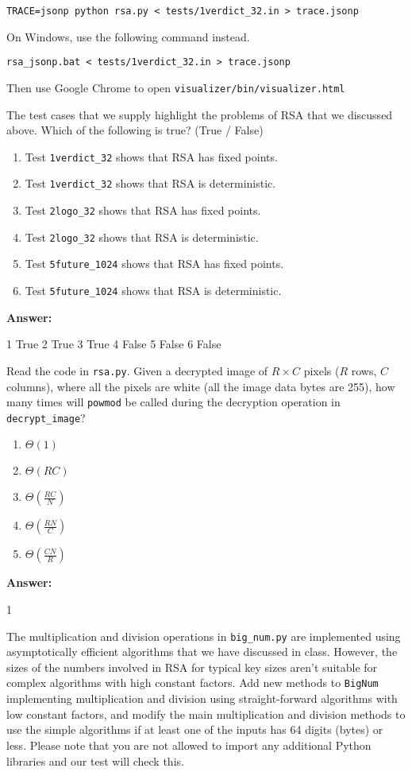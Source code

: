 \documentclass[12pt,twoside]{article}
\newcommand{\answer}{
 \par\medskip
 \textbf{Answer:}
}
\newcommand{\answerIIIe}{ \answer
1 True
2 True
3 True
4 False
5 False
6 False
}
\newcommand{\answerIIIf}{ \answer
1
}
\begin{document}
\begin{problems}
\texttt{TRACE=jsonp python rsa.py < tests/1verdict\_32.in > trace.jsonp}

On Windows, use the following command instead.

\texttt{rsa\_jsonp.bat < tests/1verdict\_32.in > trace.jsonp}

Then use Google Chrome to open
\texttt{visualizer/bin/visualizer.html}

\begin{problemparts}
\problempart {} The test cases that we supply highlight the problems of
RSA that we discussed above. Which of the following is true? (True / False)
\begin{enumerate}
  \item Test \texttt{1verdict\_32} shows that RSA has fixed points.
  \item Test \texttt{1verdict\_32} shows that RSA is deterministic.
  \item Test \texttt{2logo\_32} shows that RSA has fixed points.
  \item Test \texttt{2logo\_32} shows that RSA is deterministic.
  \item Test \texttt{5future\_1024} shows that RSA has fixed points.
  \item Test \texttt{5future\_1024} shows that RSA is deterministic.
\end{enumerate}
\answerIIIe

\problempart {} Read the code in \texttt{rsa.py}. Given a decrypted
image of $R \times C$ pixels ($R$ rows, $C$ columns), where all the pixels
are white (all the image data bytes are 255), how many times will
\texttt{powmod} be called during the decryption operation in
\texttt{decrypt\_image}?
\begin{enumerate}
  \item $\Theta(1)$
  \item $\Theta(R C)$
  \item $\Theta(\frac{RC}{N})$
  \item $\Theta(\frac{RN}{C})$
  \item $\Theta(\frac{CN}{R})$
\end{enumerate}
\answerIIIf

\problempart {} The multiplication and division operations in
\texttt{big\_num.py} are implemented using asymptotically efficient algorithms
that we have discussed in class. However, the sizes of the numbers involved in
RSA for typical key sizes aren't suitable for complex algorithms with high
constant factors. Add new methods to \texttt{BigNum} implementing multiplication
and division using straight-forward algorithms with low constant factors, and
modify the main multiplication and division methods to use the simple algorithms
if at least one of the inputs has 64 digits (bytes) or less. Please note that
you are not allowed to import any additional Python libraries and our test will
check this.
\end{problemparts}


\end{problems}
\end{document}
